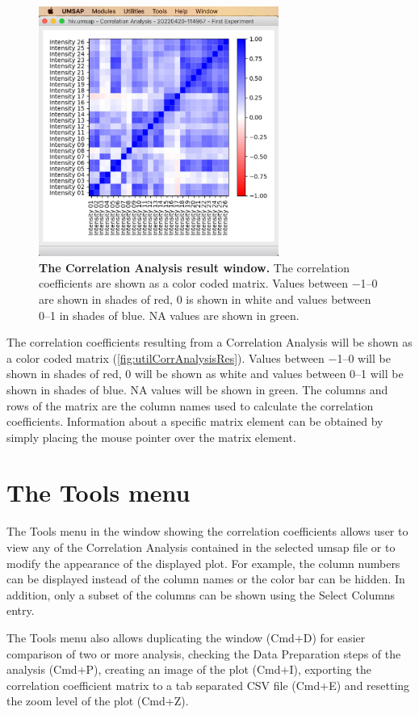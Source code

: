 \begin{figure}[h]
    \centering
    \includegraphics[width=0.7\textwidth]{./IMAGES/UTIL-CORR-WINDOW/util-corr-res.jpg}
    \caption[The Correlation Analysis result window]{\textbf{The Correlation Analysis
    result window.} The correlation coefficients are shown as a color coded matrix.
    Values between \numrange{-1}{0} are shown in shades of red, \num{0} is shown in
    white and values between \numrange{0}{1} in shades of blue. NA values are shown
    in green.}
    \label{fig:utilCorrAnalysisRes}
    \vspace{-5pt} 	
\end{figure} 

The correlation coefficients resulting from a Correlation Analysis will be shown
as a color coded matrix (\autoref{fig:utilCorrAnalysisRes}). Values between \numrange{-1}{0}
will be shown in shades of red, \num{0} will be shown as white and values between
\numrange{0}{1} will be shown in shades of blue. NA values will be shown in green.
The columns and rows of the matrix are the column names used to calculate the correlation
coefficients. Information about a specific matrix element can be obtained by simply
placing the mouse pointer over the matrix element.

\section{The Tools menu}

The Tools menu in the window showing the correlation coefficients allows user to
view any of the Correlation Analysis contained in the selected umsap file or to
modify the appearance of the displayed plot. For example, the column numbers can
be displayed instead of the column names or the color bar can be hidden. In addition,
only a subset of the columns can be shown using the Select Columns entry.

The Tools menu also allows duplicating the window (Cmd+D) for easier comparison of
two or more analysis, checking the Data Preparation steps of the analysis (Cmd+P),
creating an image of the plot (Cmd+I), exporting the correlation coefficient matrix
to a tab separated CSV file (Cmd+E) and resetting the zoom level of the plot (Cmd+Z).

